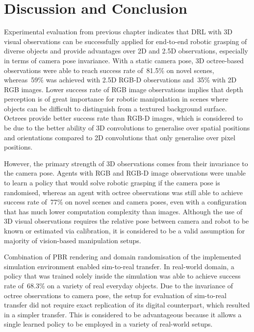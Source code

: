 \chapter{Discussion and Conclusion}\label{ch:discussion_and_conclusion}

Experimental evaluation from previous chapter indicates that DRL with 3D visual observations can be successfully applied for end-to-end robotic grasping of diverse objects and provide advantages over 2D and 2.5D observations, especially in terms of camera pose invariance. With a static camera pose, 3D octree-based observations were able to reach success rate of~81.5\% on novel scenes, whereas~59\% was achieved with 2.5D RGB-D observations and~35\% with 2D RGB images. Lower success rate of RGB image observations implies that depth perception is of great importance for robotic manipulation in scenes where objects can be difficult to distinguish from a textured background surface. Octrees provide better success rate than RGB-D images, which is considered to be due to the better ability of 3D convolutions to generalise over spatial positions and orientations compared to 2D convolutions that only generalise over pixel positions.

However, the primary strength of 3D observations comes from their invariance to the camera pose. Agents with RGB and RGB-D image observations were unable to learn a policy that would solve robotic grasping if the camera pose is randomised, whereas an agent with octree observations was still able to achieve success rate of~77\% on novel scenes and camera poses, even with a configuration that has much lower computation complexity than images. Although the use of 3D visual observations requires the relative pose between camera and robot to be known or estimated via calibration, it is considered to be a valid assumption for majority of vision-based manipulation setups.

Combination of PBR rendering and domain randomisation of the implemented simulation environment enabled sim-to-real transfer. In real-world domain, a policy that was trained solely inside the simulation was able to achieve success rate of~68.3\% on a variety of real everyday objects. Due to the invariance of octree observations to camera pose, the setup for evaluation of sim-to-real transfer did not require exact replication of its digital counterpart, which resulted in a simpler transfer. This is considered to be advantageous because it allows a single learned policy to be employed in a variety of real-world setups.

